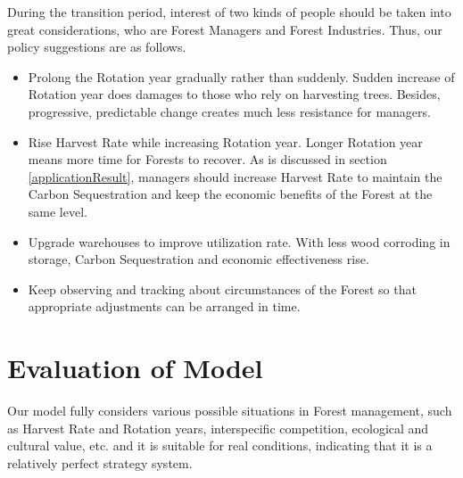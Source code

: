 \documentclass{mcmthesis}
\numberwithin{figure}{section}
\numberwithin{table}{section}
\numberwithin{equation}{section}
\begin{document}
During the transition period, interest of two kinds of people should be taken into 
great considerations, who are Forest Managers and Forest Industries. Thus, our policy 
suggestions are as follows. 
\par
\begin{itemize}
  \item Prolong the Rotation year gradually rather than suddenly. Sudden increase of 
  Rotation year does damages to those who rely on harvesting trees. Besides, progressive, 
  predictable change creates much less resistance for managers. 
  \item Rise Harvest Rate while increasing Rotation year. Longer Rotation year means more time for Forests to recover. 
  As is discussed in section \ref{applicationResult}, managers should increase Harvest Rate to
  maintain the Carbon Sequestration and keep the economic benefits of the Forest at 
  the same level.
  \item Upgrade warehouses to improve utilization rate. With less wood corroding 
  in storage, Carbon Sequestration and economic effectiveness rise.
  \item Keep observing and tracking about circumstances of the Forest so that appropriate
  adjustments can be arranged in time.
\end{itemize}



\section{Evaluation of Model}
Our model fully considers various possible situations in Forest management, 
such as Harvest Rate and Rotation years, interspecific competition, ecological 
and cultural value, etc. and it is suitable for real conditions, indicating 
that it is a relatively perfect strategy system.
\end{document}
